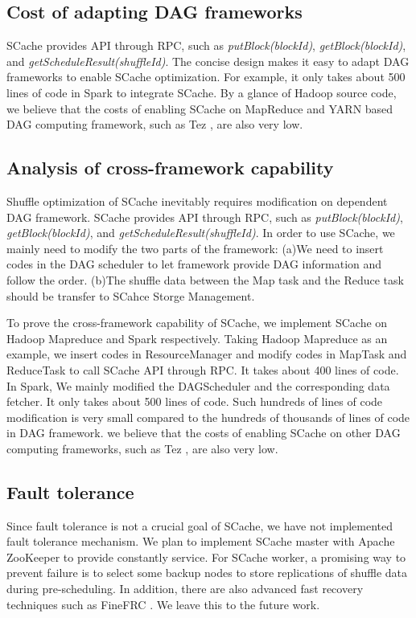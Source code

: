 {\color{red}
\subsection{Cost of adapting DAG frameworks}
SCache provides API through RPC, such as \textit{putBlock(blockId)}, \textit{getBlock(blockId)}, and \textit{getScheduleResult(shuffleId)}. The concise design makes it easy to adapt DAG frameworks to enable SCache optimization. For example, it only takes about 500 lines of code in Spark to integrate SCache. By a glance of Hadoop source code, we believe that the costs of enabling SCache on MapReduce \cite{hadoop} and YARN \cite{yarn} based DAG computing framework, such as Tez \cite{tez}, are also very low.
}
{\color{blue}
\subsection{Analysis of cross-framework capability}\label{crossframework}
Shuffle optimization of SCache inevitably requires modification on dependent DAG framework. SCache provides API through RPC, such as \textit{putBlock(blockId)}, \textit{getBlock(blockId)}, and \textit{getScheduleResult(shuffleId)}. In order to use SCache, we mainly need to modify the two parts of the framework: (a)We need to insert codes in the DAG scheduler to let framework provide DAG information and follow the order. (b)The shuffle data between the Map task and the Reduce task should be transfer to SCahce Storge Management.

To prove the cross-framework capability of SCache, we implement SCache on Hadoop Mapreduce and Spark respectively. Taking Hadoop Mapreduce as an example, we insert codes in ResourceManager and modify codes in MapTask and ReduceTask to call SCache API through RPC. It takes about 400 lines of code. In Spark, We mainly modified the DAGScheduler and the corresponding data fetcher. It only takes about 500 lines of code. Such hundreds of lines of code modification is very small compared to the hundreds of thousands of lines of code in DAG framework. we believe that the costs of enabling SCache on other DAG computing frameworks, such as Tez \cite{tez}, are also very low.
}

\subsection{Fault tolerance}\label{fault}
Since fault tolerance is not a crucial goal of SCache, we have not implemented fault tolerance mechanism. We plan to implement SCache master with Apache ZooKeeper \cite{zookeeper} to provide constantly service.  For SCache worker, a promising way to prevent failure is to select some backup nodes to store replications of shuffle data during pre-scheduling. In addition, there are also advanced fast recovery techniques such as FineFRC \cite{finefrc}. We leave this to the future work.





